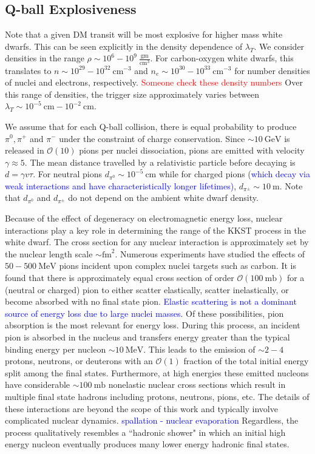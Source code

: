 \documentclass[twocolumn,showpacs,preprintnumbers,amsmath,amssymb,prl]{revtex4}
\newcommand{\OO}{\mathcal{O}}
\begin{document}
\subsection{Q-ball Explosiveness}
Note that a given DM transit will be most explosive for higher mass white dwarfs. This can be seen explicitly in the density dependence of $\lambda_T$. We consider densities in the range $\rho \sim 10^{6} - 10^{9} ~\frac{\text{gm}}{\text{cm}^3}$. For carbon-oxygen white dwarfs, this translates to $n \sim 10^{29} - 10^{32} ~\text{cm}^{-3}$ and $n_e \sim 10^{30} - 10^{33} ~\text{cm}^{-3}$ for number densities of nuclei and electrons, respectively. \textcolor{red}{Someone check these density numbers} Over this range of densities, the trigger size approximately varies between $\lambda_T \sim 10^{-5} ~\text{cm} -10^{-2} ~\text{cm}$. 

We assume that for each Q-ball collision, there is equal probability to produce $\pi^0, \pi^+$ and $\pi^-$ under the constraint of charge conservation. Since $\sim 10 ~\text{GeV}$ is released in $\OO(10)$ pions per nuclei dissociation, pions are emitted with velocity $\gamma \approx 5$. The mean distance travelled by a relativistic particle before decaying is $d = \gamma v \tau$. For neutral pions $d_{\pi^0} \sim 10^{-5} ~\text{cm}$ while for charged pions (\textcolor{blue}{which decay via weak interactions and have characteristically longer lifetimes)}, $d_{\pi^\pm} \sim 10 ~\text{m}$. Note that $d_{\pi^0}$ and $d_{\pi^\pm}$ do not depend on the ambient white dwarf density. 

Because of the effect of degeneracy on electromagnetic energy loss, nuclear interactions play a key role in determining the range of the KKST process in the white dwarf. The cross section for any nuclear interaction is approximately set by the nuclear length scale $\sim \text{fm}^2$. Numerous experiments have studied the effects of $50 - 500 ~\text{MeV}$ pions incident upon complex nuclei targets such as carbon. It is found that there is approximately equal cross section of order $\OO(100 ~\text{mb})$ for a (neutral or charged) pion to either scatter elastically, scatter inelastically, or become absorbed with no final state pion. \textcolor{blue}{Elastic scattering is not a dominant source of energy loss due to large nuclei masses.} Of these possibilities, pion absorption is the most relevant for energy loss. During this process, an incident pion is absorbed in the nucleus and transfers energy greater than the typical binding energy per nucleon $\sim 10 ~\text{MeV}$. This leads to the emission of $\sim 2-4$ protons, neutrons, or deuterons with an $\OO(1)$ fraction of the total initial energy split among the final states. Furthermore, at high energies these emitted nucleons have considerable $\sim 100 ~\text{mb}$ nonelastic nuclear cross sections which result in multiple final state hadrons including protons, neutrons, pions, etc. The details of these interactions are beyond the scope of this work and typically involve complicated nuclear dynamics. \textcolor{blue}{spallation - nuclear evaporation} Regardless, the process qualitatively resembles a ``hadronic shower" in which an initial high energy nucleon eventually produces many lower energy hadronic final states.
\end{document}
